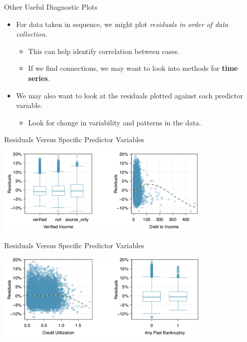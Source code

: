 \begin{frame}{Other Useful Diagnostic Plots}
    \begin{itemize}
        \item For data taken in sequence, we might plot \textit{residuals in order of data collection}.
        \begin{itemize}
            \item This can help identify correlation between cases.
            \item If we find connections, we may want to look into methods for \textbf{time series}.
        \end{itemize}
        \item We may also want to look at the residuals plotted against each predictor variable.
        \begin{itemize}
            \item Look for change in variability and patterns in the data.
        \end{itemize}
    \end{itemize}
\end{frame}

\begin{frame}{Residuals Versus Specific Predictor Variables}
    \begin{center}
        \includegraphics[width=4in]{images/multregvars1.png}
    \end{center}
\end{frame}

\begin{frame}{Residuals Versus Specific Predictor Variables}
    \begin{center}
        \includegraphics[width=4in]{images/multregvars2.png}
    \end{center}
\end{frame}

